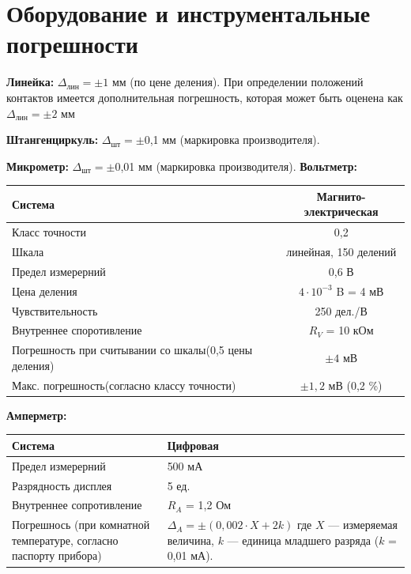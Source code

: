 \documentclass[12pt,a4paper]{article}
\begin{document}
\section{ Оборудование и инструментальные погрешности}
{\bfseries Линейка:} $\Delta _{лин} = \pm 1$ мм (по цене деления). При определении положений контактов имеется дополнительная погрешность, которая может быть оценена как $\Delta _{лин} = \pm 2$ мм

{\bfseries Штангенциркуль:} $\Delta _{шт} = \pm$0,1 мм (маркировка производителя).

{\bfseries Микрометр:} $\Delta _{шт} = \pm$0,01 мм (маркировка производителя).
{\bfseries Вольтметр:} 
\begin{table}[h!]
\quad\quad
\begin{tabular}{|p{6cm}|c|}
\hline
Система & Магнито-электрическая \\ \hline
Класс точности & 0,2  \\ \hline
Шкала & линейная,
150 делений  \\ \hline
Предел измерерний & 0,6 В  \\ \hline
Цена деления & $4 \cdot 10^{-3}$ B = 4 мВ \\ \hline
Чувствительность & 250 дел./В \\ \hline
Внутреннее споротивление & $R_V$ = 10 кОм  \\ \hline
Погрешность при считывании \newline со шкалы(0,5 цены деления) & $\pm 4$ мВ \\ \hline
Макс. погрешность\newline (согласно классу точности) 
 & $\pm 1,2$ мВ (0,2 \%) \\ \hline
\end{tabular}
\end{table}

{\bfseries Амперметр:} 
\begin{table}[h]
\quad\quad
\begin{tabular}{|p{6cm}|p{6cm}|}
\hline
Система & Цифровая \\ \hline
Предел измерерний &  500 мА  \\ \hline
Разрядность дисплея & 5 ед. \\ \hline
Внутреннее сопротивление & $R_A$ = 1,2 Ом \\ \hline
Погрешнось (при комнатной
температуре, согласно паспорту
прибора) 
 & $\Delta _{A} = \pm (0,002 \cdot X + 2k)$ \newline где $X$ — измеряемая величина, $k$ — единица младшего разряда ($k$ = 0,01 мА). \\ \hline
\end{tabular}
\end{table}
\end{document}
